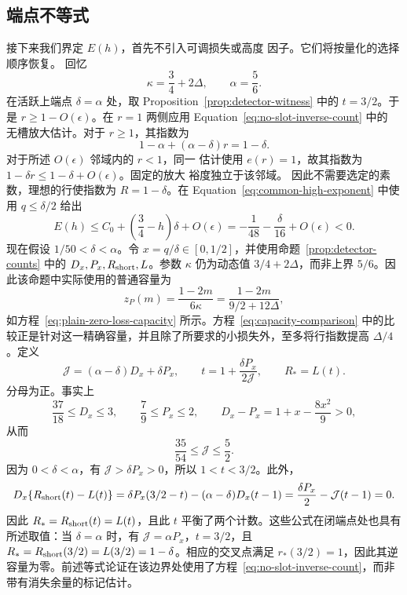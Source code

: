 \documentclass[11pt,a4paper]{article}
\numberwithin{equation}{section}
\numberwithin{figure}{section}
\theoremstyle{definition}
\theoremstyle{remark}
\begin{document}
\subsection{端点不等式}\label{sec:adaptive-endpoint}

接下来我们界定 \(E(h)\)，首先不引入可调损失或高度
因子。它们将按量化的选择顺序恢复。
回忆
\[
 \kappa=\frac34+2\Delta,\qquad \alpha=\frac56.
\]
在活跃上端点 \(\delta=\alpha\) 处，取 Proposition~\ref{prop:detector-witness} 中的
\(t=3/2\)。于是
\(r\ge1-O(\epsilon)\)。在
\(r=1\) 两侧应用 Equation~\eqref{eq:no-slot-inverse-count} 中的
无槽放大估计。对于 \(r\ge1\)，其指数为
\[
 1-\alpha+(\alpha-\delta)r=1-\delta.
\]
对于所述 \(O(\epsilon)\) 邻域内的 \(r<1\)，同一
估计使用 \(e(r)=1\)，故其指数为
\(1-\delta r\le1-\delta+O(\epsilon)\)。固定的放大
裕度独立于该邻域。
因此不需要选定的素数，理想的行使指数为
\(R=1-\delta\)。在
Equation~\eqref{eq:common-high-exponent} 中使用 \(q\le\delta/2\) 给出
\begin{equation}
 E(h)\le C_0+\left(\frac34-h\right)\delta+O(\epsilon)
       =-\frac1{48}-\frac{\delta}{16}+O(\epsilon)<0.
 \label{eq:large-delta-endpoint}
\end{equation}现在假设 \(1/50<\delta<\alpha\)。令 \(x=q/\delta\in[0,1/2]\)，并使用命题~\ref{prop:detector-counts} 中的 \(D_x,P_x,R_{\rm short},L\)。参数 \(\kappa\) 仍为动态值 \(3/4+2\Delta\)，而非上界 \(5/6\)。因此该命题中实际使用的普通容量为
\[
 z_P(m)=\frac{1-2m}{6\kappa}
       =\frac{1-2m}{9/2+12\Delta},
\]
如方程~\eqref{eq:plain-zero-loss-capacity} 所示。方程~\eqref{eq:capacity-comparison} 中的比较正是针对这一精确容量，并且除了所要求的小损失外，至多将行指数提高 \(\Delta/4\)。定义
\begin{equation}
 \mathcal J=(\alpha-\delta)D_x+\delta P_x,\qquad
 t=1+\frac{\delta P_x}{2\mathcal J},\qquad
 R_*=L(t).
 \label{eq:target-cutoff}
\end{equation}
分母为正。事实上
\[
 \frac{37}{18}\le D_x\le3,\qquad
 \frac79\le P_x\le2,\qquad
 D_x-P_x=1+x-\frac{8x^2}{9}>0,
\]
从而
\[
 \frac{35}{54}\le\mathcal J\le\frac52.
\]
因为 \(0<\delta<\alpha\)，有 \(\mathcal J>\delta P_x>0\)，所以 \(1<t<3/2\)。此外，
\[
 D_x\{R_{\rm short}(t)-L(t)\}
 =\delta P_x(3/2-t)-(\alpha-\delta)D_x(t-1)
 =\frac{\delta P_x}{2}-\mathcal J(t-1)=0.
\]
因此 \(R_*=R_{\rm short}(t)=L(t)\)，且此 \(t\) 平衡了两个计数。这些公式在闭端点处也具有所述取值：当 \(\delta=\alpha\) 时，有 \(\mathcal J=\alpha P_x\)，\(t=3/2\)，且 \(R_*=R_{\rm short}(3/2)=L(3/2)=1-\delta\)。相应的交叉点满足 \(r_*(3/2)=1\)，因此其逆容量为零。前述等式论证在该边界处使用了方程~\eqref{eq:no-slot-inverse-count}，而非带有消失余量的标记估计。
\end{document}
